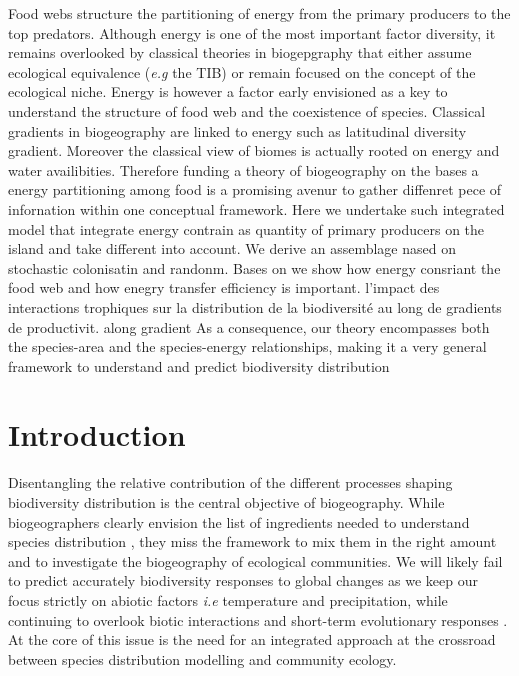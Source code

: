 Food webs structure the partitioning of energy from the primary
producers to the top predators. Although energy is one of the most
important factor diversity, it remains overlooked by classical theories
in biogepgraphy that either assume ecological equivalence (\emph{e.g}
the TIB) or remain focused on the concept of the ecological niche.
Energy is however a factor early envisioned as a key to understand the
structure of food web and the coexistence of species. Classical
gradients in biogeography are linked to energy such as latitudinal
diversity gradient. Moreover the classical view of biomes is actually
rooted on energy and water availibities. Therefore funding a theory of
biogeography on the bases a energy partitioning among food is a
promising avenur to gather diffenret pece of infornation within one
conceptual framework. Here we undertake such integrated model that
integrate energy contrain as quantity of primary producers on the island
and take different into account. We derive an assemblage nased on
stochastic colonisatin and randonm. Bases on we show how energy
consriant the food web and how enegry transfer efficiency is important.
l'impact des interactions trophiques sur la distribution de la
biodiversité au long de gradients de productivit. along gradient As a
consequence, our theory encompasses both the species-area and the
species-energy relationships, making it a very general framework to
understand and predict biodiversity distribution

\section{Introduction}\label{introduction}

Disentangling the relative contribution of the different processes
shaping biodiversity distribution is the central objective of
biogeography. While biogeographers clearly envision the list of
ingredients needed to understand species distribution
\citep{Thuiller2013}, they miss the framework to mix them in the right
amount and to investigate the biogeography of ecological communities. We
will likely fail to predict accurately biodiversity responses to global
changes as we keep our focus strictly on abiotic factors \emph{i.e}
temperature and precipitation, while continuing to overlook biotic
interactions \citep{Wiens2011} and short-term evolutionary responses
\citep{Lavergne2010}. At the core of this issue is the need for an
integrated approach at the crossroad between species distribution
modelling and community ecology.


